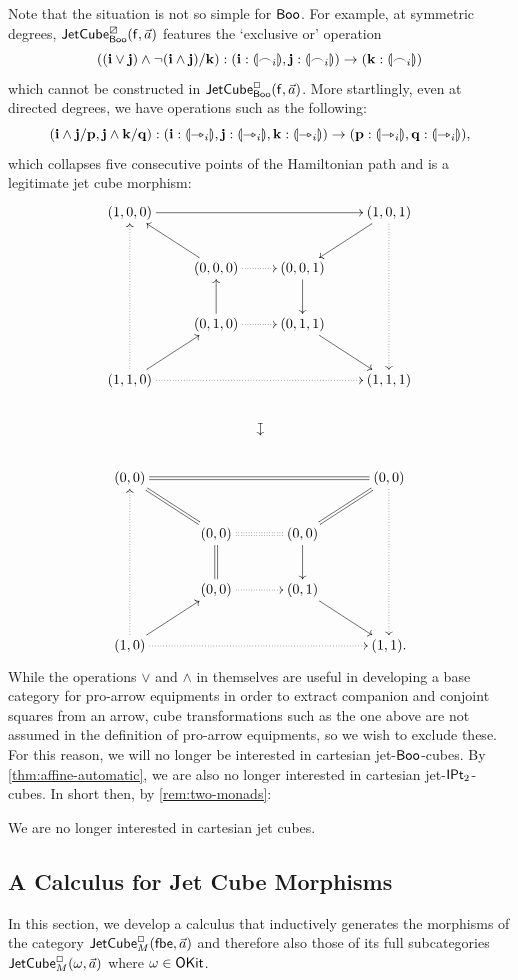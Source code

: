 \documentclass[a4paper]{memoir}
\begin{document}
Note that the situation is not so simple for $\mathsf{Boo}$.
For example, at symmetric degrees, $\mathsf{JetCube}^{\boxslash}_{\mathsf{Boo}}({\mathsf{f}},\vec a)$ features the `exclusive or' operation
\[
	((\mathbf{i} \vee \mathbf{j}) \wedge \lnot(\mathbf{i} \wedge \mathbf{j})/\mathbf{k}) : (\mathbf{i} : {\llparenthesis \frown_i \rrparenthesis}, \mathbf{j} : {\llparenthesis \frown_i \rrparenthesis}) \to (\mathbf{k} : {\llparenthesis \frown_i \rrparenthesis})
\]
which cannot be constructed in $\mathsf{JetCube}^{\Box}_{\mathsf{Boo}}({\mathsf{f}},\vec a)$.
More startlingly, even at directed degrees, we have operations such as the following:
\[
	(\mathbf{i} \wedge \mathbf{j}/\mathbf{p}, \mathbf{j} \wedge \mathbf{k}/\mathbf{q}) : (\mathbf{i} : {\llparenthesis \rightarrowtriangle_i \rrparenthesis}, \mathbf{j} : {\llparenthesis \rightarrowtriangle_i \rrparenthesis}, \mathbf{k} : {\llparenthesis \rightarrowtriangle_i \rrparenthesis}) \to (\mathbf{p} : {\llparenthesis \rightarrowtriangle_i \rrparenthesis}, \mathbf{q} : {\llparenthesis \rightarrowtriangle_i \rrparenthesis}),
\]
which collapses five consecutive points of the Hamiltonian path and is a legitimate jet cube morphism:
\[
	\xymatrix{
		(1, 0, 0)
			\ar[rrr]
		&&& (1, 0, 1)
			\ar[ld]
			\ar@{.>}[ddd]
		\\
		& (0, 0, 0)
			\ar[lu]
			\ar@{.>}[r]
		& (0, 0, 1)
			\ar[d]
		\\
		& (0, 1, 0)
			\ar[u]
			\ar@{.>}[r]
		& (0, 1, 1)
			\ar[rd]
		\\
		(1, 1, 0)
			\ar[ru]
			\ar@{.>}[uuu]
			\ar@{.>}[rrr]
			\ar@{}[rrrdd]|{\rotatebox{270}{$\mapsto$}}
		&&& (1, 1, 1)
		\\
		\\
		(0, 0)
			\ar@{=}[rrr]
		&&& (0, 0)
			\ar@{=}[ld]
			\ar@{.>}[ddd]
		\\
		& (0, 0)
			\ar@{=}[lu]
			\ar@{:}[r]
		& (0, 0)
			\ar[d]
		\\
		& (0, 0)
			\ar@{=}[u]
			\ar@{.>}[r]
		& (0, 1)
			\ar[rd]
		\\
		(1, 0)
			\ar[ru]
			\ar@{.>}[uuu]
			\ar@{.>}[rrr]
		&&& (1, 1).
	}
\]
While the operations $\vee$ and $\wedge$ in themselves are useful in developing a base category for pro-arrow equipments in order to extract companion and conjoint squares from an arrow, cube transformations such as the one above are not assumed in the definition of pro-arrow equipments, so we wish to exclude these.
For this reason, we will no longer be interested in cartesian jet-$\mathsf{Boo}$-cubes.
By \cref{thm:affine-automatic}, we are also no longer interested in cartesian jet-${\mathsf{IPt}_2}$-cubes.
In short then, by \cref{rem:two-monads}:
\begin{remark} \label{rem:no-cartesian}
	We are no longer interested in cartesian jet cubes.
\end{remark}

\subsection{A Calculus for Jet Cube Morphisms} \label{sec:jetcubes:calculus}
In this section, we develop a calculus that inductively generates the morphisms of the category \allowbreak $\mathsf{JetCube}^{\Box}_{M}({\mathsf{fbe}},\vec a)$ and therefore also those of its full subcategories $\mathsf{JetCube}^{\Box}_{M}(\omega,\vec a)$ where $\omega \in {\mathsf{OKit}}$.
\end{document}
